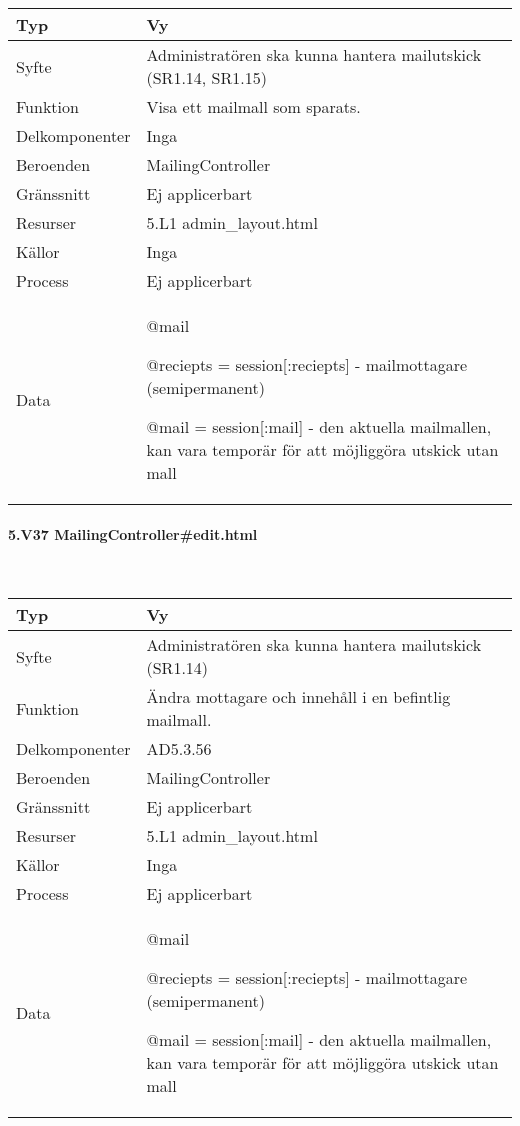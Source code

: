 \documentclass[a4paper, twoside, 11pt, titlepage]{article}
\begin{document}
			\begin {table} [ht] \begin{tabular} {  p{3.5cm} p{9.6cm} }
				\hline
				{Typ} & {Vy} \\
				\hline
				{Syfte} & {Administratören ska kunna hantera mailutskick (SR1.14, SR1.15)} \\
				\hline
				{Funktion} & {Visa ett mailmall som sparats. } \\
				\hline
				{Delkomponenter} & {Inga} \\
				\hline
				{Beroenden} & {MailingController} \\
				\hline
				{Gränssnitt} & {Ej applicerbart} \\
				\hline
				{Resurser} & {5.L1 admin\_layout.html} \\
				\hline
				{Källor} & {Inga} \\
				\hline
				{Process} & {Ej applicerbart} \\
				\hline
				{Data} & {@mail

@reciepts = session[:reciepts] - mailmottagare (semipermanent)

@mail = session[:mail] - den aktuella mailmallen, kan vara temporär för att möjliggöra utskick utan mall} \\
				\hline
			\end{tabular} \end{table} \FloatBarrier


			\paragraph{5.V37 MailingController\#edit.html}\

			\begin {table} [ht] \begin{tabular} {  p{3.5cm} p{9.6cm} }
				\hline
				{Typ} & {Vy} \\
				\hline
				{Syfte} & {Administratören ska kunna hantera mailutskick (SR1.14)} \\
				\hline
				{Funktion} & {Ändra mottagare och innehåll i en befintlig mailmall.} \\
				\hline
				{Delkomponenter} & {AD5.3.56} \\
				\hline
				{Beroenden} & {MailingController} \\
				\hline
				{Gränssnitt} & {Ej applicerbart} \\
				\hline
				{Resurser} & {5.L1 admin\_layout.html} \\
				\hline
				{Källor} & {Inga} \\
				\hline
				{Process} & {Ej applicerbart} \\
				\hline
				{Data} & {@mail

@reciepts = session[:reciepts] - mailmottagare (semipermanent)

@mail = session[:mail] - den aktuella mailmallen, kan vara temporär för att möjliggöra utskick utan mall} \\
				\hline
			\end{tabular} \end{table} \FloatBarrier
\end{document}
